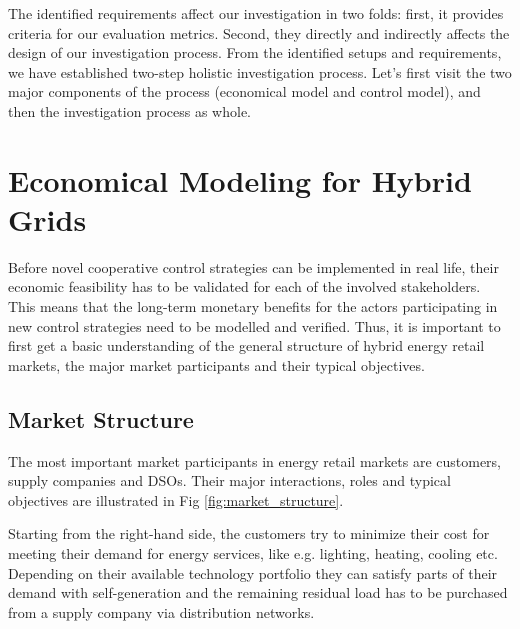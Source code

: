 \documentclass[conference]{IEEEtran}
\begin{document}
The identified requirements affect our investigation in two folds:
first, it provides criteria for our evaluation metrics. Second, they
directly and indirectly affects the design of our investigation
process. 
From the identified setups and requirements, we have established
two-step holistic investigation process. Let's first visit the two
major components of the process (economical model and control model),
and then the investigation process as whole. 
 
\section{Economical Modeling for Hybrid Grids}
\label{sec:econ} 
Before novel cooperative control strategies can be implemented in real
life, their economic feasibility has to be validated for each of the
involved stakeholders. This means that the long-term monetary benefits
for the actors participating in new control strategies need to be
modelled and verified. Thus, it is important to first get a basic
understanding of the general structure of hybrid energy retail
markets, the major market participants and their typical objectives.

\subsection{Market Structure}
\label{sec:econ-1}

The most important market participants in energy retail markets are
customers, supply companies and DSOs. Their major interactions, roles
and typical objectives are illustrated in Fig \ref{fig:market_structure}. 

Starting from the right-hand side, the customers try to minimize their
cost for meeting their demand for energy services, like e.g. lighting,
heating, cooling etc. Depending on their available technology
portfolio they can satisfy parts of their demand with self-generation
and the remaining residual load has to be purchased from a supply
company via distribution networks. 
\end{document}
